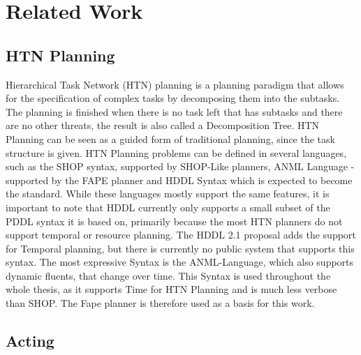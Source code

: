 \section{Related Work}\label{sec:related-work}


\subsection{HTN Planning}\label{sec:htn-planning}

Hierarchical Task Network (HTN) planning is a planning paradigm that allows for the specification of complex tasks by decomposing them into the subtasks.
The planning is finished when there is no task left that has subtasks and there are no other threats, the result is also called a Decomposition Tree.
HTN Planning can be seen as a guided form of traditional planning, since the task structure is given.
HTN Planning problems can be defined in several languages, such as the SHOP syntax, supported by SHOP-Like planners, ANML Language - supported by the FAPE planner and HDDL Syntax which is expected to become the standard.
While these languages mostly support the same features, it is important to note that HDDL currently only supports a small subset of the PDDL syntax it is based on, primarily because the most HTN planners do not support temporal or resource planning.
The HDDL 2.1 proposal adds the support for Temporal planning, but there is currently no public system that supports this syntax.
The most expressive Syntax is the ANML-Language, which also supports dynamic fluents, that change over time.
This Syntax is used throughout the whole thesis, as it supports Time for HTN Planning and is much less verbose than SHOP.
The Fape planner is therefore used as a basis for this work.


\subsection{Acting}\label{sec:acting}

